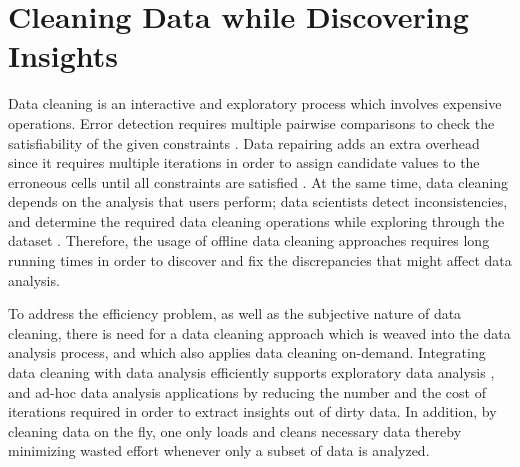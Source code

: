 \section{Cleaning Data while Discovering Insights}
\label{sec:cleaning}

%

Data cleaning is an interactive and exploratory process which involves expensive operations. 
Error detection requires multiple pairwise comparisons to check the satisfiability of the given constraints \cite{cleanm}.
Data repairing adds an extra overhead since it requires multiple iterations in order to assign candidate values to the
erroneous cells until all constraints are satisfied \cite{nadeef,data_quality,bigdansing,Stonebraker_datacuration}. 
At the same time, data cleaning depends on the analysis that users perform;
data scientists detect inconsistencies, and determine the required data cleaning operations 
while exploring through the dataset \cite{eda}. 
Therefore, the usage of offline data cleaning approaches requires long running times in order to discover and fix the discrepancies that might affect data analysis.

To address the efficiency problem, as well as the subjective nature of data cleaning, there 
is need for a data cleaning approach which
is weaved into the data analysis process, and which also applies data cleaning on-demand. 
Integrating data cleaning with data analysis efficiently supports exploratory data analysis \cite{exploratory_analysis}, and ad-hoc data analysis applications \cite{transform-by-ex} 
by reducing the number and the cost of iterations required in order to extract insights out of dirty data.
In addition, by cleaning data on the fly, one only loads and cleans necessary data thereby minimizing wasted effort whenever only a subset of data is analyzed.

